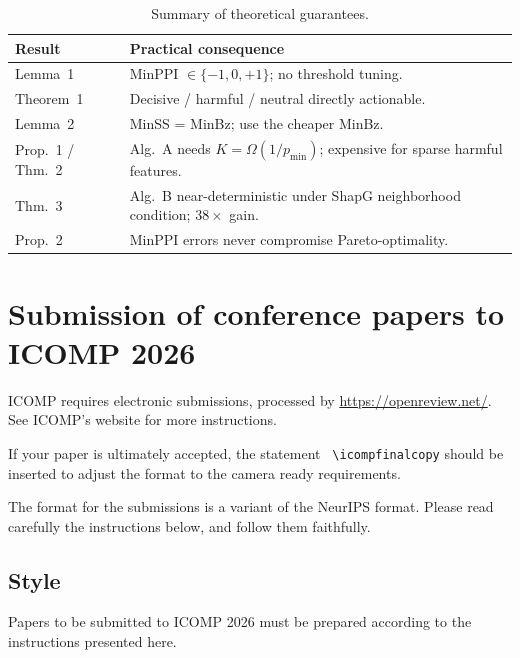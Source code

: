\documentclass{article} %
\begin{document}
\begin{table}[t]
\caption{Summary of theoretical guarantees.}
\label{tab:guarantees}
\begin{center}
\begin{tabular}{lp{7.2cm}}
\toprule
\textbf{Result} & \textbf{Practical consequence} \\
\midrule
Lemma~1 & MinPPI $\in\{-1,0,+1\}$; no threshold tuning. \\
Theorem~1 & Decisive / harmful / neutral directly actionable. \\
Lemma~2 & MinSS = MinBz; use the cheaper MinBz. \\
Prop.~1 / Thm.~2 & Alg.~A needs $K=\Omega(1/p_{\min})$; expensive for sparse harmful features. \\
Thm.~3 & Alg.~B near-deterministic under ShapG neighborhood condition; $38\times$ gain. \\
Prop.~2 & MinPPI errors never compromise Pareto-optimality. \\
\bottomrule
\end{tabular}
\end{center}
\end{table}

\section{Submission of conference papers to ICOMP 2026}

ICOMP requires electronic submissions, processed by
\url{https://openreview.net/}. See ICOMP's website for more instructions.

If your paper is ultimately accepted, the statement {\tt
  {\textbackslash}icompfinalcopy} should be inserted to adjust the
format to the camera ready requirements.

The format for the submissions is a variant of the NeurIPS format.
Please read carefully the instructions below, and follow them
faithfully.

\subsection{Style}

Papers to be submitted to ICOMP 2026 must be prepared according to the
instructions presented here.

\end{document}
